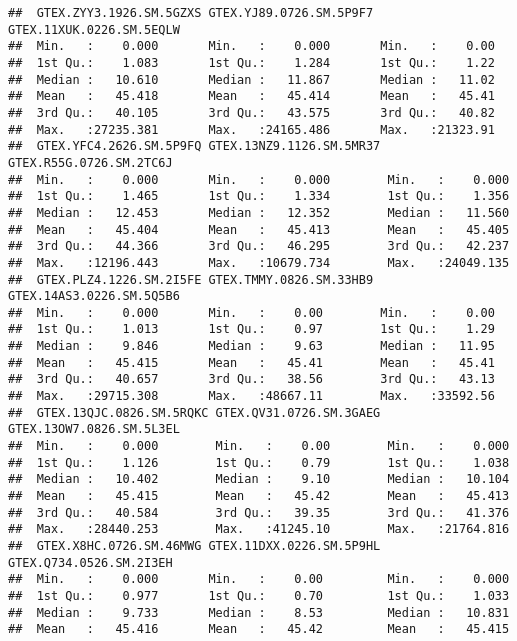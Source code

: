 \documentclass[
]{article}
\begin{document}
\begin{verbatim}
##  GTEX.ZYY3.1926.SM.5GZXS GTEX.YJ89.0726.SM.5P9F7 GTEX.11XUK.0226.SM.5EQLW
##  Min.   :    0.000       Min.   :    0.000       Min.   :    0.00        
##  1st Qu.:    1.083       1st Qu.:    1.284       1st Qu.:    1.22        
##  Median :   10.610       Median :   11.867       Median :   11.02        
##  Mean   :   45.418       Mean   :   45.414       Mean   :   45.41        
##  3rd Qu.:   40.105       3rd Qu.:   43.575       3rd Qu.:   40.82        
##  Max.   :27235.381       Max.   :24165.486       Max.   :21323.91        
##  GTEX.YFC4.2626.SM.5P9FQ GTEX.13NZ9.1126.SM.5MR37 GTEX.R55G.0726.SM.2TC6J
##  Min.   :    0.000       Min.   :    0.000        Min.   :    0.000      
##  1st Qu.:    1.465       1st Qu.:    1.334        1st Qu.:    1.356      
##  Median :   12.453       Median :   12.352        Median :   11.560      
##  Mean   :   45.404       Mean   :   45.413        Mean   :   45.405      
##  3rd Qu.:   44.366       3rd Qu.:   46.295        3rd Qu.:   42.237      
##  Max.   :12196.443       Max.   :10679.734        Max.   :24049.135      
##  GTEX.PLZ4.1226.SM.2I5FE GTEX.TMMY.0826.SM.33HB9 GTEX.14AS3.0226.SM.5Q5B6
##  Min.   :    0.000       Min.   :    0.00        Min.   :    0.00        
##  1st Qu.:    1.013       1st Qu.:    0.97        1st Qu.:    1.29        
##  Median :    9.846       Median :    9.63        Median :   11.95        
##  Mean   :   45.415       Mean   :   45.41        Mean   :   45.41        
##  3rd Qu.:   40.657       3rd Qu.:   38.56        3rd Qu.:   43.13        
##  Max.   :29715.308       Max.   :48667.11        Max.   :33592.56        
##  GTEX.13QJC.0826.SM.5RQKC GTEX.QV31.0726.SM.3GAEG GTEX.13OW7.0826.SM.5L3EL
##  Min.   :    0.000        Min.   :    0.00        Min.   :    0.000       
##  1st Qu.:    1.126        1st Qu.:    0.79        1st Qu.:    1.038       
##  Median :   10.402        Median :    9.10        Median :   10.104       
##  Mean   :   45.415        Mean   :   45.42        Mean   :   45.413       
##  3rd Qu.:   40.584        3rd Qu.:   39.35        3rd Qu.:   41.376       
##  Max.   :28440.253        Max.   :41245.10        Max.   :21764.816       
##  GTEX.X8HC.0726.SM.46MWG GTEX.11DXX.0226.SM.5P9HL GTEX.Q734.0526.SM.2I3EH
##  Min.   :    0.000       Min.   :    0.00         Min.   :    0.000      
##  1st Qu.:    0.977       1st Qu.:    0.70         1st Qu.:    1.033      
##  Median :    9.733       Median :    8.53         Median :   10.831      
##  Mean   :   45.416       Mean   :   45.42         Mean   :   45.415      

\end{verbatim}
\end{document}
